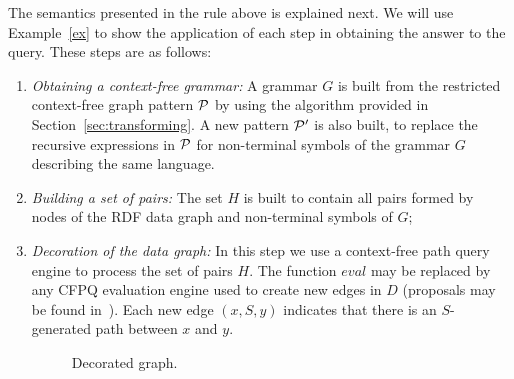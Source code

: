 \documentclass[runningheads]{llncs}
\begin{document}
The semantics presented in the rule above %
is explained next.
We will use Example~\ref{ex} to show the application of each step in obtaining the answer to the query.
These steps are as follows:
\begin{enumerate}
    \item \textit{Obtaining a context-free grammar:} A grammar $G$ is built from the restricted context-free graph pattern ${\cal P}$ by using the algorithm provided in Section~\ref{sec:transforming}.
    A new pattern ${\cal P}'$ is also built, to replace the recursive expressions in ${\cal P}$ for non-terminal symbols of the grammar $G$ describing the same language.
    
    \smallskip
    \smallskip

    \item \textit{Building a set of pairs:} The set $H$ is built to contain all pairs formed by nodes of the RDF data graph and non-terminal symbols of $G$;
    
    \smallskip
    \smallskip
    
    
    \item \textit{Decoration of the data graph:} In this step we use a context-free path query engine to process the set of pairs $H$.
    The function $eval$ may be replaced by any CFPQ evaluation engine used to create new edges in $D$ (proposals may be found in~\cite{Hellings14,Hellings2015pathresults,azimov-grigorev2017matrix,MEDEIROS2019}).
    Each new edge  $(x, S, y)$ indicates that there is an $S$-generated path between $x$ and $y$.
    
    \smallskip
    \begin{figure}[h!]
        \centering
        
        \caption{Decorated graph.}
        \label{fig:decorated}
    \end{figure}
    \smallskip
    

\end{enumerate}
\end{document}

